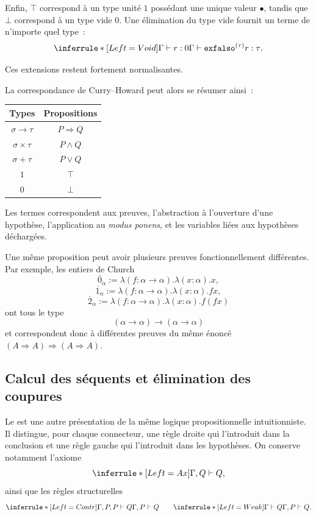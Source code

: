Enfin, $\top$ correspond à un type unité $1$ possédant une unique
valeur $\bullet$, tandis que $\bot$ correspond à un type vide $0$.
Une élimination du type vide fournit un terme de n'importe quel type :
\[
\inferrule*[Left={Void}]
 {\Gamma\vdash r:0}
 {\Gamma\vdash\texttt{exfalso}^{(\tau)}r:\tau}.
\]

Ces extensions restent fortement normalisantes.

\thingy La correspondance de Curry--Howard peut alors se résumer ainsi :
\begin{center}
\begin{tabular}{c|c}
Types & Propositions\\ \hline
$\sigma\to\tau$ & $P\Rightarrow Q$\\
$\sigma\times\tau$ & $P\land Q$\\
$\sigma+\tau$ & $P\lor Q$\\
$1$ & $\top$\\
$0$ & $\bot$
\end{tabular}
\end{center}
Les termes correspondent aux preuves, l'abstraction à l'ouverture
d'une hypothèse, l'application au \textit{modus ponens}, et les
variables liées aux hypothèses déchargées.

Une même proposition peut avoir plusieurs preuves fonctionnellement
différentes. Par exemple, les entiers de Church
\[
\overline{0}_\alpha
 :=\lambda(f:\alpha\to\alpha).\lambda(x:\alpha).x,
\]
\[
\overline{1}_\alpha
 :=\lambda(f:\alpha\to\alpha).\lambda(x:\alpha).fx,
\]
\[
\overline{2}_\alpha
 :=\lambda(f:\alpha\to\alpha).\lambda(x:\alpha).f(fx)
\]
ont tous le type
\[
(\alpha\to\alpha)\to(\alpha\to\alpha)
\]
et correspondent donc à différentes preuves du même énoncé
$(A\Rightarrow A)\Rightarrow(A\Rightarrow A)$.

\subsection{Calcul des séquents et élimination des coupures}

\thingy Le  est une autre présentation de la
même logique propositionnelle intuitionniste. Il distingue, pour
chaque connecteur, une règle droite qui l'introduit dans la conclusion
et une règle gauche qui l'introduit dans les hypothèses. On conserve
notamment l'axiome
\[
\inferrule*[Left={Ax}]{ }{\Gamma,Q\vdash Q},
\]
ainsi que les règles structurelles
\[
\inferrule*[Left={Contr}]
 {\Gamma,P,P\vdash Q}
 {\Gamma,P\vdash Q}
\qquad
\inferrule*[Left={Weak}]
 {\Gamma\vdash Q}
 {\Gamma,P\vdash Q}.
\]

